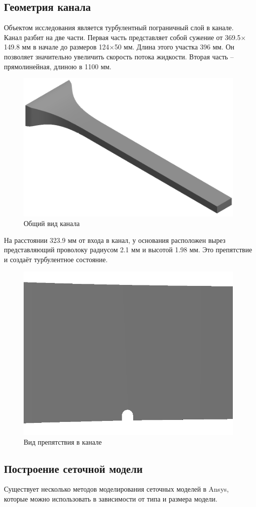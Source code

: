 \subsection{Геометрия канала}
	Объектом исследования является турбулентный пограничный слой в канале. Канал разбит на две части. Первая часть представляет собой сужение от 369.5$\times$149.8 мм в начале до размеров 124$\times$50 мм. Длина этого участка 396 мм. Он позволяет значительно увеличить скорость потока жидкости. Вторая часть -- прямолинейная, длиною в 1100 мм.
	\begin{figure}[H]
		\centering
		\includegraphics[width=0.7\linewidth]{../Assets/ВидКанала1}
		\caption{Общий вид канала}
		\label{fig:channelview}
	\end{figure}
	На расстоянии 323.9 мм от входа в канал, у основания расположен вырез представляющий проволоку радиусом 2.1 мм и высотой 1.98 мм. Это препятствие и создаёт турбулентное состояние. 
	\begin{figure}[H]
		\centering
		\includegraphics[width=0.6\linewidth]{../Assets/ВидКанала4}
		\caption{Вид препятствия в канале}
		\label{fig:vortexgeneratorview}
	\end{figure}

\subsection{Построение сеточной модели}
	Существует несколько методов моделирования сеточных моделей в Ansys, которые можно использовать в зависимости от типа и размера модели.
	
